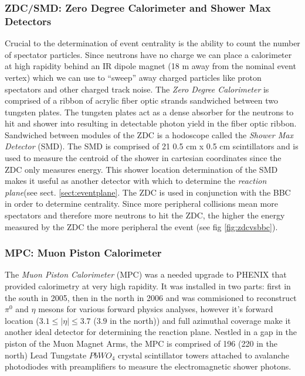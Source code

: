 \subsubsection{ZDC/SMD: Zero Degree Calorimeter and Shower Max Detectors}
\label{sect:ZDC}

Crucial to the determination of event centrality is the ability to count the number of spectator particles. Since neutrons have no charge we can place a calorimeter at high rapidity behind an IR dipole magnet (18 m away from the nominal event vertex) which we can use to ``sweep'' away charged particles like proton spectators and other charged track noise. The \textit{Zero Degree Calorimeter}\citep{ZDCfocus} is comprised of a ribbon of acrylic fiber optic strands sandwiched between two tungsten plates. The tungsten plates act as a dense absorber for the neutrons to hit and shower into resulting in detectable photon yield in the fiber optic ribbon. Sandwiched between modules of the ZDC is a hodoscope called the \textit{Shower Max Detector} (SMD). The SMD is comprised of 21 0.5 cm x 0.5 cm scintillators and is used to measure the centroid of the shower in cartesian coordinates since the ZDC only measures energy\citep{phenixzdc}. This shower location determination of the SMD makes it useful as another detector with which to determine the \textit{reaction plane}(see sect. \ref{sect:eventplane}. The ZDC is used in conjunction with the BBC in order to determine centrality. Since more peripheral collisions mean more spectators and therefore more neutrons to hit the ZDC, the higher the energy measured by the ZDC the more peripheral the event (see fig \ref{fig:zdcvsbbc}\citep{Ghosh2001}).

\subsubsection{MPC: Muon Piston Calorimeter}
The \textit{Muon Piston Calorimeter} (MPC) was a needed upgrade to PHENIX that provided calorimetry at very high rapidity\citep{kleinjanthesis}. It was installed in two parts: first in the south in 2005, then in the north in 2006 and was commisioned to reconstruct $\pi^{0}$ and $\eta$ mesons for various forward physics analyses, however it's forward location ($3.1 \leq  | \eta | \leq 3.7$ ($3.9$ in the north)) and full azimuthal coverage make it another ideal detector for determining the reaction plane. Nestled in a gap in the piston of the Muon Magnet Arms, the MPC is comprised of 196 (220 in the north) Lead Tungstate $PbWO_4$ crystal scintillator towers attached to avalanche photodiodes with preamplifiers to measure the electromagnetic shower photons.  

